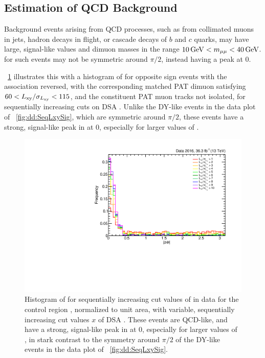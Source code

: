 \subsection{Estimation of QCD Background}
\label{sec:dd:bgest-QCD}
Background events arising from QCD processes, such as from collimated muons in jets, hadron decays in flight, or cascade decays of $b$ and $c$ quarks, may have large, signal-like \LxySig values and dimuon masses in the range $10\,\text{Ge\hspace{-.08em}V} < m_{\mathrm{\mu}\mathrm{\mu}} < 40\,\text{Ge\hspace{-.08em}V}$.
\DeltaPhi for such events may not be symmetric around $\pi/2$, instead having a peak at 0.

\Fig~\ref{fig:dd:SeqLxySig_QCD_DeltaPhi} illustrates this with a histogram of \DeltaPhi for opposite sign events with the \DSAToPAT association reversed, with the corresponding matched PAT dimuon satisfying $60 < L_{\mathrm{xy}}/\sigma_{L_{\mathrm{xy}}} < 115$, and the constituent PAT muon tracks not isolated, for sequentially increasing cuts on DSA \LxySig.
Unlike the DY-like events in the data plot of \Fig~\ref{fig:dd:SeqLxySig}, which are symmetric around $\pi/2$, these events have a strong, signal-like peak in \DeltaPhi at 0, especially for larger values of \LxySig.

\begin{figure}[htpb]
  \centering
  \includegraphics[width=\DFigWidth]{figures/displaced/BGEST_EffectOfLxySigCut_DeltaPhi_Data_QCD-Like.pdf}
  \caption[Histogram of \DeltaPhi for sequentially increasing cut values of \LxySig for QCD-like events in data.]{Histogram of \DeltaPhi for sequentially increasing cut values of \LxySig in data for the control region , normalized to unit area, with variable, sequentially increasing cut values $x$ of DSA \LxySig. These events are QCD-like, and have a strong, signal-like peak in \DeltaPhi at 0, especially for larger values of \LxySig, in stark contrast to the symmetry around $\pi/2$ of the DY-like events in the data plot of \Fig~\ref{fig:dd:SeqLxySig}.}
  \label{fig:dd:SeqLxySig_QCD_DeltaPhi}
\end{figure}

